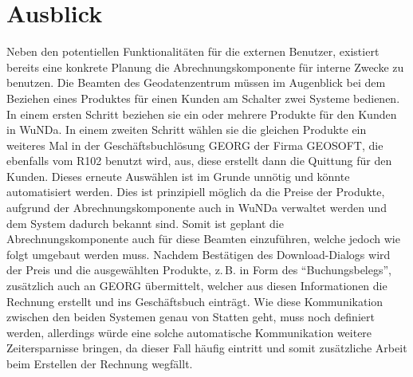 \section{Ausblick}
Neben den potentiellen Funktionalitäten für die externen Benutzer, existiert bereits eine konkrete Planung die Abrechnungskomponente für interne Zwecke zu benutzen.
Die Beamten des Geodatenzentrum müssen im Augenblick bei dem Beziehen eines Produktes für einen Kunden am Schalter zwei Systeme bedienen.
In einem ersten Schritt beziehen sie ein oder mehrere Produkte für den Kunden in \ac{WuNDa}.
In einem zweiten Schritt wählen sie die gleichen Produkte ein weiteres Mal in der Geschäftsbuchlösung GEORG der Firma GEOSOFT, die ebenfalls vom R102 benutzt wird, aus, diese erstellt dann die Quittung für den Kunden.
Dieses erneute Auswählen ist im Grunde unnötig und könnte automatisiert werden.
Dies ist prinzipiell möglich da die Preise der Produkte, aufgrund der Abrechnungskomponente auch in \ac{WuNDa} verwaltet werden und dem System dadurch bekannt sind.
Somit ist geplant die Abrechnungskomponente auch für diese Beamten einzuführen, welche jedoch wie folgt umgebaut werden muss.
Nachdem Bestätigen des Download-Dialogs wird der Preis und die ausgewählten Produkte, z.\,B. in Form des \enquote{Buchungsbelegs}, zusätzlich auch an GEORG übermittelt, welcher aus diesen Informationen die Rechnung erstellt und ins Geschäftsbuch einträgt.
Wie diese Kommunikation zwischen den beiden Systemen genau von Statten geht, muss noch definiert werden, allerdings würde eine solche automatische Kommunikation weitere Zeitersparnisse bringen, da dieser Fall häufig eintritt und somit zusätzliche Arbeit beim Erstellen der Rechnung wegfällt.




